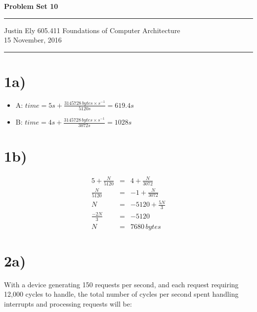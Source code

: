 \documentclass[a4paper,11pt]{article}
\begin{document}
\begin{flushright}

\vspace{1.1cm}

{\bf\Huge Problem Set 10}

\rule{0.25\linewidth}{0.5pt}

\vspace{0.5cm}
Justin Ely
\linebreak
\newline
\footnotesize{605.411 Foundations of Computer Architecture \\}
\vspace{0.5cm}
15 November, 2016
\end{flushright}

\noindent\rule{\linewidth}{1.0pt}


\section*{1a)}
\begin{itemize}
  \item A: $time = 5s + \frac{3145728 \, bytes \times s^{-1}}{5120s} = 619.4s$
  \item B: $time = 4s + \frac{3145728 \, bytes \times s^{-1}}{3072s} = 1028s$
\end{itemize}


\section*{1b)}
\begin{eqnarray}
5 + \frac{N}{5120} &=& 4 + \frac{N}{3072} \\
\frac{N}{5120} &=& -1 + \frac{N}{3072} \\
N &=& -5120 + \frac{5N}{3} \\
 \frac{-2N}{3}  &=& -5120 \\
 N  &=& 7680 \, bytes
\end{eqnarray} 



\section*{2a)} 
With a device generating 150 requests per second, and each request requiring 12,000 cycles to handle, the total number of 
cycles per second spent handling interrupts and processing requests will be: \\
\end{document}
